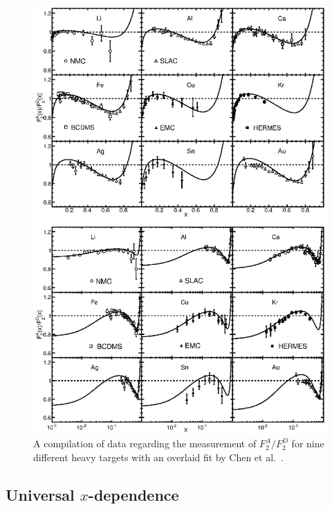 \begin{figure}
	\centering
	\includegraphics[height=0.9\textheight]{figures/background/emc-all-targ.eps}
	\caption{A compilation of data regarding the measurement of $F^A_2/F_2^D$ for nine different heavy targets with an overlaid fit by Chen et al.~\cite{Chen:2013oga}.}
	\label{fig:emc-all-targ}
\end{figure}

\subsection{\texorpdfstring{Universal $x$-dependence}{Universal x-dependence}}

